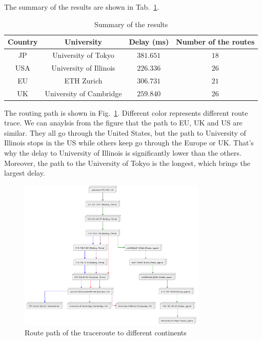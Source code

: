 \documentclass{cshwk}
\begin{document}
The summary of the results are shown in Tab.~\ref{tab:summary}.
\begin{table}[H]
    \centering
    \begin{tabular}{cccc}
        \hline
        Country & University              & Delay (ms) & Number of the routes \\
        \hline  
        JP      & University of Tokyo     & $381.651$  & $18$                 \\
        USA     & University of Illinois  & $226.336$  & $26$                 \\
        EU      & ETH Zurich              & $306.731$  & $21$                 \\
        UK      & University of Cambridge & $259.840$  & $26$                 \\
        \hline
    \end{tabular}
    \caption{Summary of the results}
    \label{tab:summary}
\end{table}

The routing path is shown in Fig.~\ref{fig:route-diff-continent}. Different color represents different route trace. We can anaylsis from the figure that the path to EU, UK and US are similar. They all go through the United States, but the path to University of Illinois stops in the US while others keep go through the Europe or UK. That's why the delay to University of Illinois is significantly lower than the others. Moreover, the path to the University of Tokyo is the longest, which brings the largest delay. 

\begin{figure}[H]
    \centering
    \includegraphics[width=0.8\textwidth]{hw1-3-2.pdf}
    \caption{Route path of the traceroute to different continents}
    \label{fig:route-diff-continent}
\end{figure}
\end{document}
